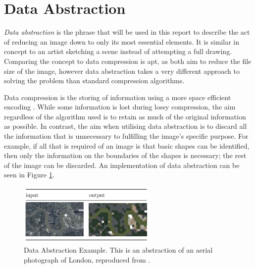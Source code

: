 \section{Data Abstraction}
\label{Subsection:abstract}

\textit{Data abstraction} is the phrase that will be used in this report to describe the act of reducing an image down to only its most essential elements. It is similar in concept to an artist sketching a scene instead of attempting a full drawing. Comparing the concept to data compression is apt, as both aim to reduce the file size of the image, however data abstraction takes a very different approach to solving the problem than standard compression algorithms.

Data compression is the storing of information using a more space efficient encoding \cite{sayood2005introduction}. While some information is lost during lossy compression, the aim regardless of the algorithm used is to retain as much of the original information as possible. In contrast, the aim when utilising data abstraction is to discard all the information that is unnecessary to fulfilling the image's specific purpose. For example, if all that is required of an image is that basic shapes can be identified, then only the information on the boundaries of the shapes is necessary; the rest of the image can be discarded. An implementation of data abstraction can be seen in Figure \ref{fig:abstraction3rdyear}.


\begin{figure}[H]
    \begin{center}
      \includegraphics[width=0.6\textwidth]{Figures/abstraction3rdyear.png}
      \caption[Data Abstraction Example]{Data Abstraction Example. This is an abstraction of an aerial photograph of London, reproduced from \cite{abstraction3rdyear}.}
      \label{fig:abstraction3rdyear}
    \end{center}
\end{figure}

